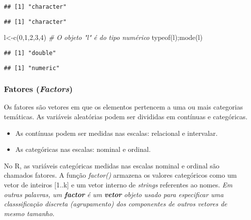 \documentclass[
]{book}
\newenvironment{Shaded}{\begin{snugshade}}{\end{snugshade}}
\newcommand{\CommentTok}[1]{\textcolor[rgb]{0.56,0.35,0.01}{\textit{#1}}}
\newcommand{\DecValTok}[1]{\textcolor[rgb]{0.00,0.00,0.81}{#1}}
\newcommand{\FunctionTok}[1]{\textcolor[rgb]{0.00,0.00,0.00}{#1}}
\newcommand{\NormalTok}[1]{#1}
\newcommand{\OtherTok}[1]{\textcolor[rgb]{0.56,0.35,0.01}{#1}}
\providecommand{\tightlist}{%
  \setlength{\itemsep}{0pt}\setlength{\parskip}{0pt}}
\begin{document}
\begin{verbatim}
## [1] "character"
\end{verbatim}

\begin{verbatim}
## [1] "character"
\end{verbatim}

\begin{Shaded}
\begin{Highlighting}[]
\NormalTok{l}\OtherTok{\textless{}{-}}\FunctionTok{c}\NormalTok{(}\DecValTok{0}\NormalTok{,}\DecValTok{1}\NormalTok{,}\DecValTok{2}\NormalTok{,}\DecValTok{3}\NormalTok{,}\DecValTok{4}\NormalTok{) }\CommentTok{\# O objeto "l" é do tipo numérico}
\FunctionTok{typeof}\NormalTok{(l);}\FunctionTok{mode}\NormalTok{(l)}
\end{Highlighting}
\end{Shaded}

\begin{verbatim}
## [1] "double"
\end{verbatim}

\begin{verbatim}
## [1] "numeric"
\end{verbatim}

\hypertarget{fatores-factors}{%
\subsubsection{\texorpdfstring{Fatores (\emph{Factors})}{Fatores (Factors)}}\label{fatores-factors}}

Os fatores são vetores em que os elementos pertencem a uma ou mais categorias temáticas.
As variáveis aleatórias podem ser divididas em contínuas e categóricas.

\begin{itemize}
\tightlist
\item
  As contínuas podem ser medidas nas escalas: relacional e intervalar.
\item
  As categóricas nas escalas: nominal e ordinal.
\end{itemize}

No R, as variáveis categóricas medidas nas escalas nominal e ordinal são chamados fatores.
A função \emph{factor()} armazena os valores categóricos como um vetor de inteiros {[}1..k{]} e um vetor interno de \emph{strings} referentes ao nomes.
\emph{Em outras palavras, um \textbf{factor} é um \textbf{vetor} objeto usado para especificar uma classsificação discreta (agrupamento) dos componentes de outros vetores de mesmo tamanho.}
\end{document}
